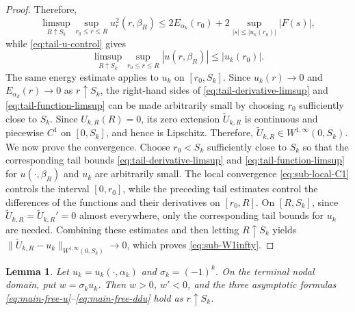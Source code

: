 \documentclass[11pt]{article}
\newtheorem{lemma}[theorem]{Lemma}
\begin{document}
\begin{proof}
Therefore,
\begin{equation}
\limsup_{R\uparrow S_k}
\sup_{r_0\leq r\leq R}
u_r^2(r,\beta_R)
\leq
2E_{\alpha_k}(r_0)
+2\sup_{|s|\le |u_k(r_0)|}|F(s)|,
\label{eq:tail-derivative-limsup}
\end{equation}
while \eqref{eq:tail-u-control} gives
\begin{equation}
\limsup_{R\uparrow S_k}
\sup_{r_0\leq r\leq R}
|u(r,\beta_R)|
\leq |u_k(r_0)|.
\label{eq:tail-function-limsup}
\end{equation}
The same energy estimate applies to $u_k$ on $[r_0,S_k]$.
Since $u_k(r)\rightarrow0$ and $E_{\alpha_k}(r)\rightarrow0$ as $r\uparrow S_k$, the right-hand sides of \eqref{eq:tail-derivative-limsup} and \eqref{eq:tail-function-limsup} can be made arbitrarily small by choosing $r_0$ sufficiently close to $S_k$. Since $U_{k,R}(R)=0$, its zero extension
$\widetilde U_{k,R}$ is continuous and piecewise $C^1$ on
$[0,S_k]$, and hence is Lipschitz.
Therefore,
$\widetilde U_{k,R}\in W^{1,\infty}(0,S_k)$. We now prove the convergence.
Choose $r_0<S_k$ sufficiently close
to $S_k$ so that the corresponding tail bounds \eqref{eq:tail-derivative-limsup} and \eqref{eq:tail-function-limsup} for $u(\cdot,\beta_R)$ and $u_k$ are arbitrarily small. The local convergence \eqref{eq:sub-local-C1} controls the interval $[0,r_0]$,
while the preceding tail estimates control the differences of the
functions and their derivatives on $[r_0,R]$. On $[R,S_k]$, since $\widetilde U_{k,R}=\widetilde U_{k,R}'=0$ almost everywhere,
only the corresponding tail bounds for $u_k$ are needed. Combining
these estimates and then letting $R\uparrow S_k$ yields
{$\|\widetilde U_{k,R}-u_k\|_{W^{1,\infty}(0,S_k)}\rightarrow0$},
which proves \eqref{eq:sub-W1infty}.
\end{proof}

\begin{lemma}\label{lem:sub-free-rate}
Let $u_k=u_k(\cdot,\alpha_k)$ and $\sigma_k=(-1)^k$. On the terminal nodal
domain, put $w=\sigma_k u_k$. Then $w>0$, $w'<0$, and the three
asymptotic formulas \eqref{eq:main-free-u}--\eqref{eq:main-free-ddu}
hold as $r\uparrow S_k$.
\end{lemma}
\end{document}
